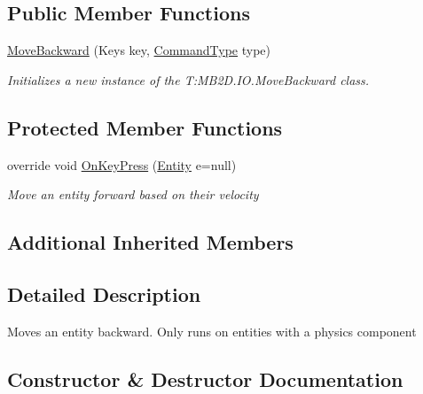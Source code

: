 \subsection*{Public Member Functions}
\begin{DoxyCompactItemize}
\item 
\hyperlink{class_m_b2_d_1_1_i_o_1_1_move_backward_a2c041f3a72975a1bda8c8a69e0556230}{Move\+Backward} (Keys key, \hyperlink{namespace_m_b2_d_1_1_i_o_ab5f95f3fe9e652778b62bdf943168a68}{Command\+Type} type)
\begin{DoxyCompactList}\small\item\em Initializes a new instance of the T\+:\+M\+B2\+D.\+I\+O.\+Move\+Backward class. \end{DoxyCompactList}\end{DoxyCompactItemize}
\subsection*{Protected Member Functions}
\begin{DoxyCompactItemize}
\item 
override void \hyperlink{class_m_b2_d_1_1_i_o_1_1_move_backward_a15c5da82d35b95c0a04e8fdc89dcd839}{On\+Key\+Press} (\hyperlink{class_m_b2_d_1_1_entity_component_1_1_entity}{Entity} e=null)
\begin{DoxyCompactList}\small\item\em Move an entity forward based on their velocity \end{DoxyCompactList}\end{DoxyCompactItemize}
\subsection*{Additional Inherited Members}


\subsection{Detailed Description}
Moves an entity backward. Only runs on entities with a physics component 



\subsection{Constructor \& Destructor Documentation}
\hypertarget{class_m_b2_d_1_1_i_o_1_1_move_backward_a2c041f3a72975a1bda8c8a69e0556230}{}\label{class_m_b2_d_1_1_i_o_1_1_move_backward_a2c041f3a72975a1bda8c8a69e0556230} 
